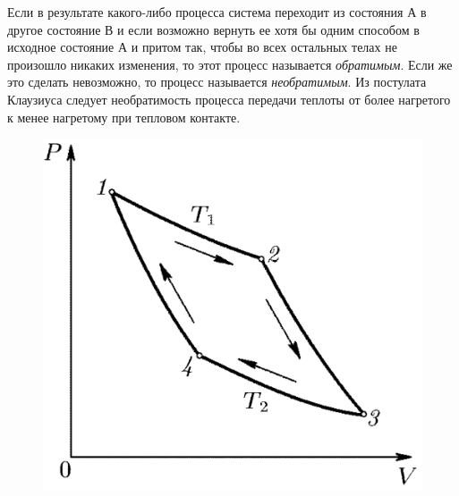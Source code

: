 \documentclass[14pt,a4paper]{scrartcl}
\begin{document}
		\quad Если в результате какого-либо процесса система переходит из состояния А в другое состояние В и если возможно вернуть ее хотя бы одним способом в исходное состояние А и притом так, чтобы во всех остальных телах не произошло никаких изменения, то этот процесс называется \textit{обратимым}. Если же это сделать невозможно, то	процесс называется \textit{необратимым}. Из постулата Клаузиуса следует необратимость процесса передачи теплоты от более нагретого к менее нагретому при тепловом контакте.\\
		
		\begin{figure} 
				\vspace{-2ex}
			\includegraphics[width=\linewidth]{karno.png}
		\end{figure}
\end{document}
